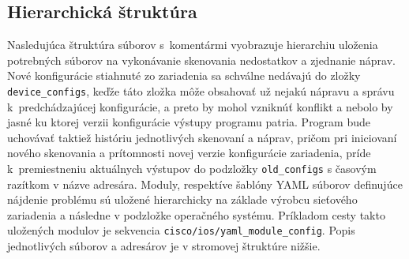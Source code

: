 \subsection*{Hierarchická štruktúra}
\label{hierarchy_struct}
Nasledujúca štruktúra súborov s~komentármi vyobrazuje hierarchiu uloženia potrebných súborov na vykonávanie skenovania nedostatkov a zjednanie náprav. Nové konfigurácie stiahnuté zo zariadenia sa schválne nedávajú do zložky \texttt{device\_configs}, keďže táto zložka môže obsahovať už nejakú nápravu a správu k~predchádzajúcej konfigurácie, a preto by mohol vzniknúť konflikt a nebolo by jasné ku ktorej verzii konfigurácie výstupy programu patria. Program bude uchovávať taktiež históriu jednotlivých skenovaní a náprav, pričom pri iniciovaní nového skenovania a prítomnosti novej verzie konfigurácie zariadenia, príde k~premiestneniu aktuálnych výstupov do podzložky \texttt{old\_configs} s časovým razítkom v názve adresára. Moduly, respektíve šablóny YAML súborov definujúce nájdenie problému sú uložené hierarchicky na základe výrobcu sieťového zariadenia a následne v podzložke operačného systému. Príkladom cesty takto uložených modulov je sekvencia \texttt{cisco/ios/yaml\_module\_config}. Popis jednotlivých súborov a adresárov je v stromovej štruktúre nižšie.

